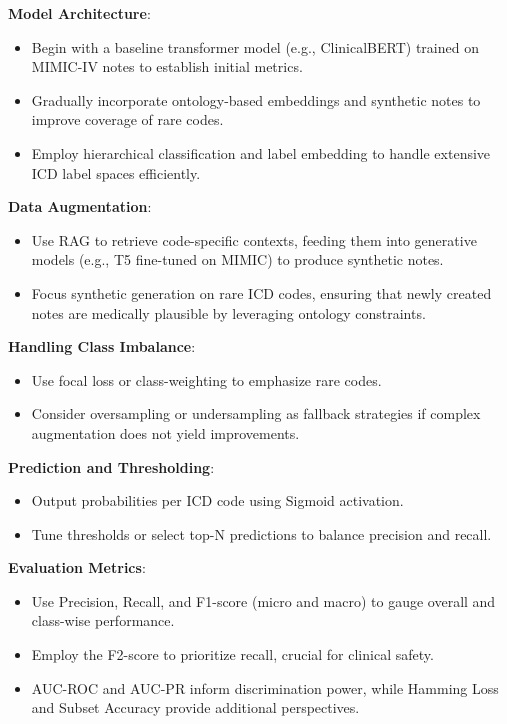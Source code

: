 \documentclass[10pt,a4paper]{article}
\begin{document}
\textbf{Model Architecture}:
\begin{itemize}
    \item Begin with a baseline transformer model (e.g., ClinicalBERT) trained on MIMIC-IV notes to establish initial metrics.
    \item Gradually incorporate ontology-based embeddings and synthetic notes to improve coverage of rare codes.
    \item Employ hierarchical classification and label embedding to handle extensive ICD label spaces efficiently.
\end{itemize}

\textbf{Data Augmentation}:
\begin{itemize}
    \item Use RAG to retrieve code-specific contexts, feeding them into generative models (e.g., T5 fine-tuned on MIMIC) to produce synthetic notes.
    \item Focus synthetic generation on rare ICD codes, ensuring that newly created notes are medically plausible by leveraging ontology constraints.
\end{itemize}

\textbf{Handling Class Imbalance}:
\begin{itemize}
    \item Use focal loss or class-weighting to emphasize rare codes.
    \item Consider oversampling or undersampling as fallback strategies if complex augmentation does not yield improvements.
\end{itemize}

\textbf{Prediction and Thresholding}:
\begin{itemize}
    \item Output probabilities per ICD code using Sigmoid activation.
    \item Tune thresholds or select top-N predictions to balance precision and recall.
\end{itemize}

\textbf{Evaluation Metrics}:
\begin{itemize}
    \item Use Precision, Recall, and F1-score (micro and macro) to gauge overall and class-wise performance.
    \item Employ the F2-score to prioritize recall, crucial for clinical safety.
    \item AUC-ROC and AUC-PR inform discrimination power, while Hamming Loss and Subset Accuracy provide additional perspectives.
\end{itemize}
\end{document}
